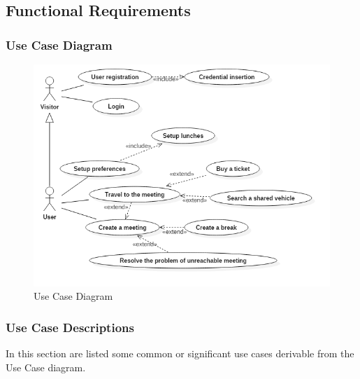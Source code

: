 \subsection{Functional Requirements}

\subsubsection{Use Case Diagram}
\begin{figure}[!h]
\centering
\includegraphics[scale=0.8]{images/UseCaseDiagram}
\caption{Use Case Diagram}
\label{ref:usecasediagram}
\end{figure}
\subsubsection{Use Case Descriptions}

In this section are listed some common or significant use cases derivable from
the Use Case diagram.

